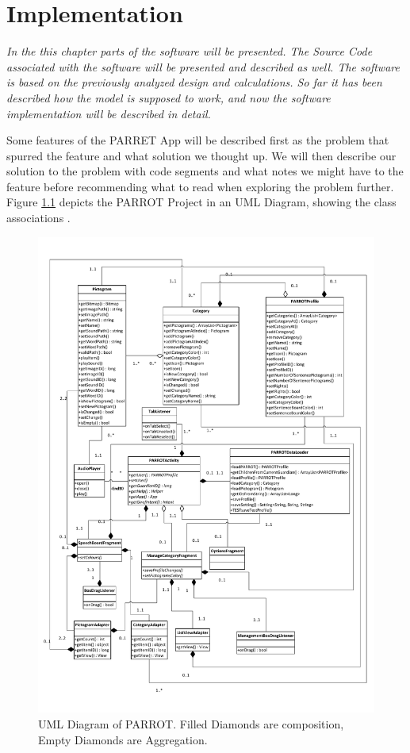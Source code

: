 \chapter{Implementation}
\label{imp}
\textit{In the this chapter parts of the software will be presented. The Source Code associated with the software will be presented and described as well. The software is based on the previously analyzed design and calculations. So far it has been described how the model is supposed to work, and now the software implementation will be described in detail.}

Some features of the PARRET App will be described first as the problem that spurred the feature and what solution we thought up. 
We will then describe our solution to the problem with code segments and what notes we might have to the feature before recommending what to read when exploring the problem further.\\

Figure \ref{fig:ClassUMLPARROTPDF} depicts the PARROT Project in an UML Diagram, showing the class associations .

\begin{figure}
	\centering
		\includegraphics[width=1.0\textwidth]{input/images/ClassUMLPARROTPDF.pdf}
	\caption{UML Diagram of PARROT. Filled Diamonds are composition, Empty Diamonds are Aggregation.}
	\label{fig:ClassUMLPARROTPDF}
\end{figure}



